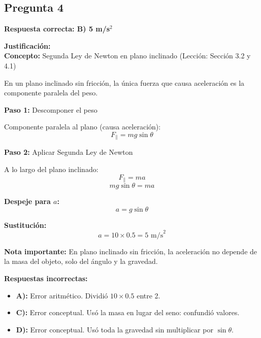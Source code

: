\begin{respuestabox}
\subsection{Pregunta 4}
\textcolor{verdecorrecto}{\textbf{Respuesta correcta: B) 5 m/s$^2$}}

\textbf{Justificación:}\\
\textbf{Concepto:} Segunda Ley de Newton en plano inclinado (Lección: Sección 3.2 y 4.1)

En un plano inclinado sin fricción, la única fuerza que causa aceleración es la componente paralela del peso.

\textbf{Paso 1:} Descomponer el peso

Componente paralela al plano (causa aceleración):
$$F_{\parallel} = mg \sin\theta$$

\textbf{Paso 2:} Aplicar Segunda Ley de Newton

A lo largo del plano inclinado:
$$F_{\parallel} = ma$$
$$mg \sin\theta = ma$$

\textbf{Despeje para $a$:}
$$a = g \sin\theta$$

\textbf{Sustitución:}
$$a = 10 \times 0.5 = 5 \text{ m/s}^2$$

\textbf{Nota importante:} En plano inclinado sin fricción, la aceleración no depende de la masa del objeto, solo del ángulo y la gravedad.

\textbf{Respuestas incorrectas:}
\begin{itemize}
    \item \textbf{A):} Error aritmético. Dividió $10 \times 0.5$ entre 2.
    \item \textbf{C):} Error conceptual. Usó la masa en lugar del seno: confundió valores.
    \item \textbf{D):} Error conceptual. Usó toda la gravedad sin multiplicar por $\sin\theta$.
\end{itemize}
\end{respuestabox}

